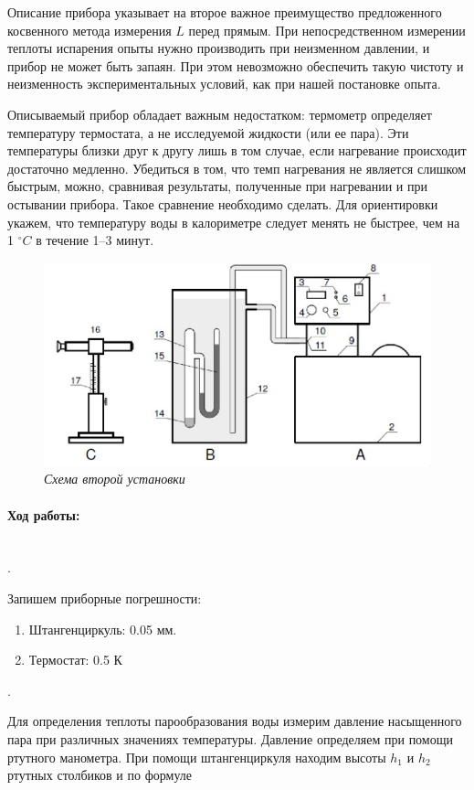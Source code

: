 \documentclass[a4paper, 12pt]{article}
\newcommand{\parag}[1]{\paragraph*{#1:}}
\newcounter{Points}
\newcommand{\point}{\arabic{Points}. \addtocounter{Points}{1}}
\begin{document}
Описание прибора указывает на второе важное преимущество предложенного косвенного метода измерения $ L $ перед прямым. При непосредственном измерении теплоты испарения опыты нужно производить при неизменном давлении, и прибор не может быть запаян. При этом невозможно обеспечить такую чистоту и неизменность экспериментальных условий, как при нашей постановке опыта.

Описываемый прибор обладает важным недостатком: термометр определяет температуру термостата, а не исследуемой жидкости (или ее пара). Эти температуры близки друг к другу лишь в том случае, если нагревание происходит достаточно медленно. Убедиться в том, что темп нагревания не является слишком быстрым, можно, сравнивая результаты, полученные при нагревании и при остывании прибора. Такое сравнение необходимо сделать. Для ориентировки укажем, что температуру воды в калориметре следует менять не быстрее, чем на 1 $ ^\circ C $ в течение 1–3 минут.

\begin{figure}[H]
\begin{center}
		\includegraphics[width=15cm]{ust2.png}
\end{center}
	\caption{\textit{Схема второй установки}}
	\label{img2}
\end{figure}

\parag {Ход работы} ~\\


\point Запишем приборные погрешности: 
\begin{enumerate}
    \item Штангенциркуль: 0.05 мм.
    \item Термостат: 0.5 К
\end{enumerate}

\point Для определения теплоты парообразования воды измерим давление насыщенного пара при различных значениях температуры. Давление определяем при помощи ртутного манометра. При помощи штангенциркуля находим высоты $ h_1 $ и $ h_2 $ ртутных столбиков и по формуле
\end{document}
